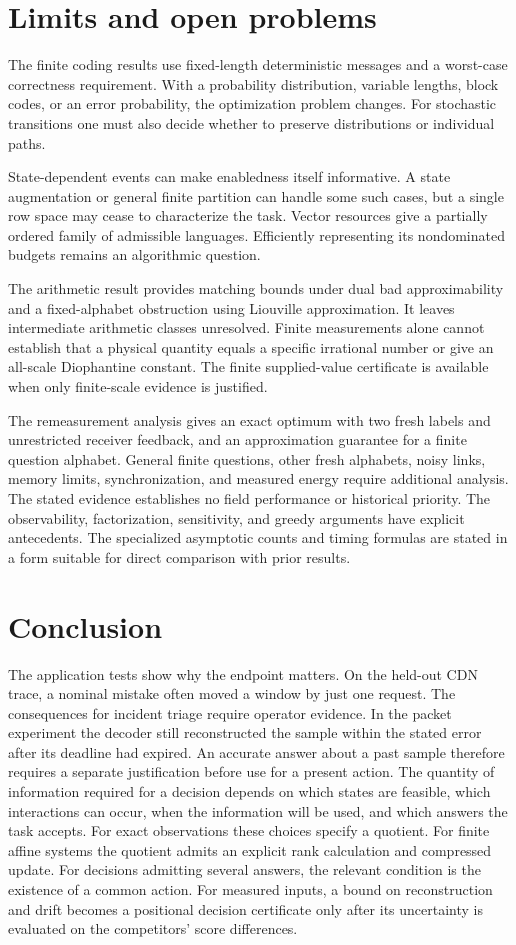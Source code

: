 \section{Limits and open problems}
The finite coding results use fixed-length deterministic messages and a worst-case correctness requirement. With a probability distribution, variable lengths, block codes, or an error probability, the optimization problem changes. For stochastic transitions one must also decide whether to preserve distributions or individual paths.

State-dependent events can make enabledness itself informative. A state augmentation or general finite partition can handle some such cases, but a single row space may cease to characterize the task. Vector resources give a partially ordered family of admissible languages. Efficiently representing its nondominated budgets remains an algorithmic question.

The arithmetic result provides matching bounds under dual bad approximability and a fixed-alphabet obstruction using Liouville approximation. It leaves intermediate arithmetic classes unresolved. Finite measurements alone cannot establish that a physical quantity equals a specific irrational number or give an all-scale Diophantine constant. The finite supplied-value certificate is available when only finite-scale evidence is justified.

The remeasurement analysis gives an exact optimum with two fresh labels and unrestricted receiver feedback, and an approximation guarantee for a finite question alphabet. General finite questions, other fresh alphabets, noisy links, memory limits, synchronization, and measured energy require additional analysis. The stated evidence establishes no field performance or historical priority. The observability, factorization, sensitivity, and greedy arguments have explicit antecedents. The specialized asymptotic counts and timing formulas are stated in a form suitable for direct comparison with prior results.

\section{Conclusion}
The application tests show why the endpoint matters. On the held-out CDN trace, a nominal mistake often moved a window by just one request. The consequences for incident triage require operator evidence. In the packet experiment the decoder still reconstructed the sample within the stated error after its deadline had expired. An accurate answer about a past sample therefore requires a separate justification before use for a present action.
The quantity of information required for a decision depends on which states are feasible, which interactions can occur, when the information will be used, and which answers the task accepts. For exact observations these choices specify a quotient. For finite affine systems the quotient admits an explicit rank calculation and compressed update. For decisions admitting several answers, the relevant condition is the existence of a common action. For measured inputs, a bound on reconstruction and drift becomes a positional decision certificate only after its uncertainty is evaluated on the competitors' score differences.

